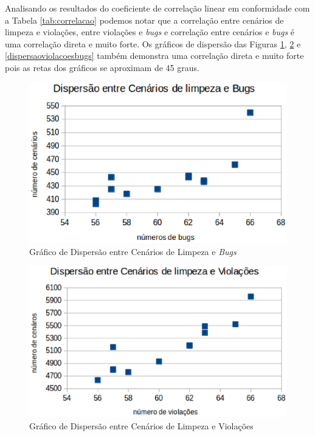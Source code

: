 Analisando os resultados do coeficiente de correlação linear em conformidade com a Tabela \ref{tab:correlacao} podemos notar que a correlação entre cenários de limpeza e violações, entre violações e \textit{bugs} e correlação entre cenários e \textit{bugs} é uma correlação direta e muito forte. Os gráficos de dispersão das Figuras \ref{dispercaocenariosbugs}, \ref{dispersaocenariosviolacoes} e \ref{dispersaoviolacoesbugs} também demonstra uma correlação direta e muito forte pois as retas dos gráficos se aproximam de 45 graus.

\begin{figure}[h!]
\centering
\includegraphics[keepaspectratio=false,scale=0.40]{figuras/figuras_nilton/dispercaocenariosbugs.eps}
\caption{Gráfico de Dispersão entre Cenários de Limpeza e \textit{Bugs}}
\label{dispercaocenariosbugs}
\end{figure}


\begin{figure}[h!]
\centering
\includegraphics[keepaspectratio=false,scale=0.40]{figuras/figuras_nilton/dispersaocenariosviolacoes.eps}
\caption{Gráfico de Dispersão entre Cenários de Limpeza e Violações}
\label{dispersaocenariosviolacoes}
\end{figure}

